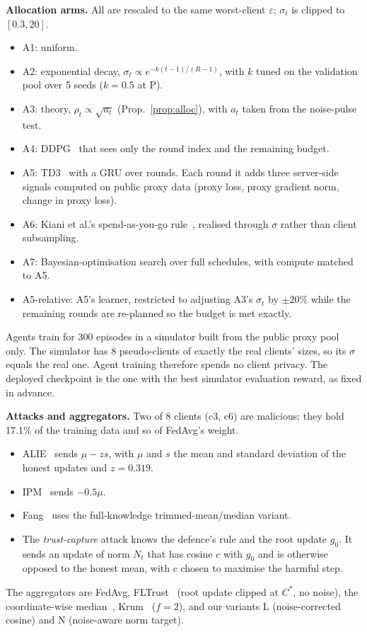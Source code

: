 \documentclass[journal]{IEEEtran}
\newcommand{\eps}{\varepsilon}
\begin{document}
\textbf{Allocation arms.} All are rescaled to the same worst-client $\eps$; $\sigma_t$ is clipped
to $[0.3, 20]$.
\begin{itemize}
  \item A1: uniform.
  \item A2: exponential decay, $\sigma_t \propto e^{-k(t-1)/(R-1)}$, with $k$ tuned on the validation
  pool over 5 seeds ($k = 0.5$ at P).
  \item A3: theory, $\rho_t \propto \sqrt{a_t}$ (Prop.~\ref{prop:alloc}), with $a_t$ taken from the
  noise-pulse test.
  \item A4: DDPG~\cite{lillicrap2016ddpg} that sees only the round index and the remaining budget.
  \item A5: TD3~\cite{fujimoto2018td3} with a GRU over rounds. Each round it adds three server-side
  signals computed on public proxy data (proxy loss, proxy gradient norm, change in proxy loss).
  \item A6: Kiani et al.'s spend-as-you-go rule~\cite{kiani2025timeadaptive}, realised through $\sigma$
  rather than client subsampling.
  \item A7: Bayesian-optimisation search over full schedules, with compute matched to A5.
  \item A5-relative: A5's learner, restricted to adjusting A3's $\sigma_t$ by $\pm20\%$ while the
  remaining rounds are re-planned so the budget is met exactly.
\end{itemize}
Agents train for 300 episodes in a simulator built from the public proxy pool only. The simulator
has 8 pseudo-clients of exactly the real clients' sizes, so its $\sigma$ equals the real one. Agent
training therefore spends no client privacy. The deployed checkpoint is the one with the best
simulator evaluation reward, as fixed in advance.

\textbf{Attacks and aggregators.} Two of 8 clients (c3, c6) are malicious; they hold 17.1\% of the
training data and so of FedAvg's weight.
\begin{itemize}
  \item ALIE~\cite{baruch2019alie} sends $\mu - z s$, with $\mu$ and $s$ the mean and standard
  deviation of the honest updates and $z = 0.319$.
  \item IPM~\cite{xie2019ipm} sends $-0.5\mu$.
  \item Fang~\cite{fang2020localpoison} uses the full-knowledge trimmed-mean/median variant.
  \item The \emph{trust-capture} attack knows the defence's rule and the root update $g_0$. It sends
  an update of norm $N_t$ that has cosine $c$ with $g_0$ and is otherwise opposed to the honest
  mean, with $c$ chosen to maximise the harmful step.
\end{itemize}
The aggregators are FedAvg, FLTrust~\cite{cao2021fltrust} (root update clipped at $C^\ast$, no noise),
the coordinate-wise median~\cite{yin2018median}, Krum~\cite{blanchard2017krum} ($f=2$), and our
variants L (noise-corrected cosine) and N (noise-aware norm target).
\end{document}
